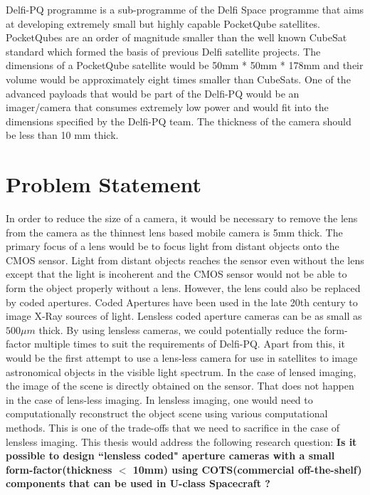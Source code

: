 Delfi-PQ programme is a sub-programme of the Delfi Space programme that aims at developing extremely small but highly capable PocketQube satellites. PocketQubes are an order of magnitude smaller than the well known CubeSat standard which formed the basis of previous Delfi satellite projects. The dimensions of a PocketQube satellite would be 50mm * 50mm * 178mm and their volume would be approximately eight times smaller than CubeSats. One of the advanced payloads that would be part of the Delfi-PQ would be an imager/camera that consumes extremely low power and would fit into the dimensions specified by the Delfi-PQ team. The thickness of the camera should be less than 10 mm thick.
 
 
\section{Problem Statement}
In order to reduce the size of a camera, it would be necessary to remove the lens from the camera as the thinnest lens based mobile camera is 5mm thick. The primary focus of a lens would be to focus light from distant objects onto the CMOS sensor. Light from distant objects reaches the sensor even without the lens except that the light is incoherent and the CMOS sensor would not be able to form the object properly without a lens. However, the lens could also be replaced by coded apertures. Coded Apertures have been used in the late 20th century to image X-Ray sources of light. Lensless coded aperture cameras can be as small as $500 \mu m$ thick. By using lensless cameras, we could potentially reduce the form-factor multiple times to suit the requirements of Delfi-PQ. Apart from this, it would be the first attempt to use a lens-less camera for use in satellites to image astronomical objects in the visible light spectrum. In the case of lensed imaging, the image of the scene is directly obtained on the sensor. That does not happen in the case of lens-less imaging. In lensless imaging, one would need to computationally reconstruct the object scene using various computational methods. This is one of the trade-offs that we need to sacrifice in the case of lensless imaging.
This thesis would address the following research question:
\textbf{Is it possible to design ``lensless coded" aperture cameras with a small form-factor(thickness $<$ 10mm) using COTS(commercial off-the-shelf) components that can be used in U-class Spacecraft ?}


